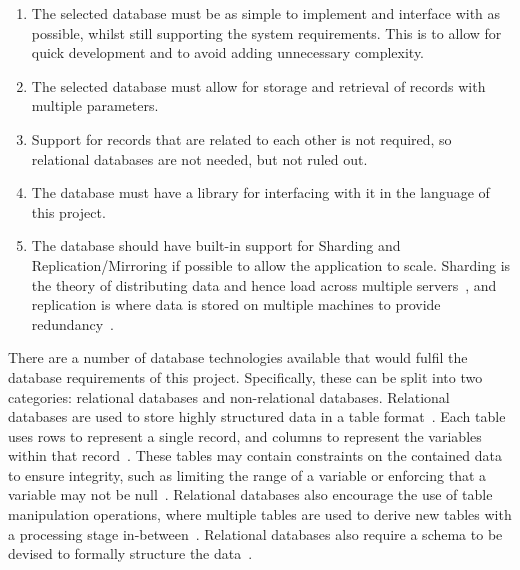 \documentclass[authoryearcitations]{UoYCSproject}
\begin{document}
\begin{enumerate}
  \item The selected database must be as simple to implement and interface with as possible, whilst still supporting the system requirements.  This is to allow for quick development and to avoid adding unnecessary complexity.
  \item The selected database must allow for storage and retrieval of records with multiple parameters.
  \item Support for records that are related to each other is not required, so relational databases are not needed, but not ruled out.
  \item The database must have a library for interfacing with it in the language of this project.
  \item The database should have built-in support for Sharding and Replication/Mirroring if possible to allow the application to scale. Sharding is the theory of distributing data and hence load across multiple servers~\cite{aboutSharding}, and replication is where data is stored on multiple machines to provide redundancy~\cite{aboutReplication}.
\end{enumerate}

There are a number of database technologies available that would fulfil the database requirements of this project.  Specifically, these can be split into two categories: relational databases and non-relational databases. Relational databases are used to store highly structured data in a table format~\cite{introToDatabaseSys}. Each table uses rows to represent a single record, and columns to represent the variables within that record~\cite{introToDatabaseSys}. These tables may contain constraints on the contained data to ensure integrity, such as limiting the range of a variable or enforcing that a variable may not be null~\cite{introToDatabaseSys}. Relational databases also encourage the use of table manipulation operations, where multiple tables are used to derive new tables with a processing stage in-between~\cite{introToDatabaseSys}. Relational databases also require a schema to be devised to formally structure the data~\cite{Parker:2013:CNM:2498328.2500047}.
\end{document}
